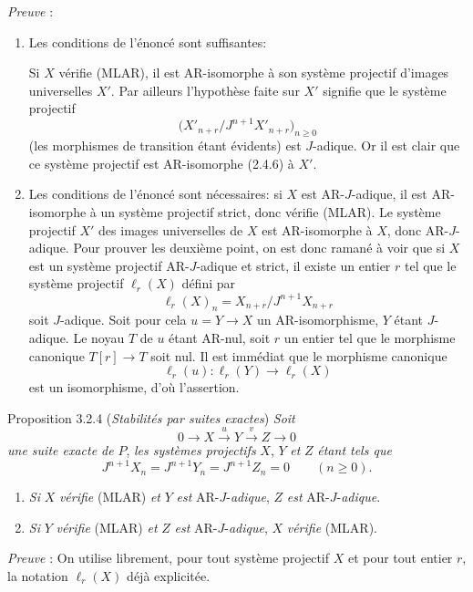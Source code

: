 \emph{Preuve} :
\begin{enumerate}[label=(\alph*)]
\item Les conditions de l'énoncé sont suffisantes:

Si $X$ vérifie (MLAR), il est AR-isomorphe à son système projectif d'images universelles $X'$. Par ailleurs l'hypothèse faite sur $X'$ signifie que le système projectif
\[
\bigl(X'_{n+r}/J^{n+1}X'_{n+r}\bigr)_{n\ge0}
\]
(les morphismes de transition étant évidents) est $J$-adique. Or il est clair que ce système projectif est AR-isomorphe (2.4.6) à $X'$.
\item Les conditions de l'énoncé sont nécessaires: si $X$ est AR-$J$-adique, il est AR-isomorphe à un système projectif strict, donc vérifie (MLAR). 
Le
système projectif $X'$ des images universelles de $X$ est AR-isomorphe à $X$, donc AR-$J$-adique. Pour prouver les deuxième point, on est donc ramané à voir que si $X$ est un système projectif AR-$J$-adique et strict, il existe un entier $r$ tel que le système projectif $\ell_r(X)$ défini par
\[
\ell_r(X)_n=X_{n+r}/J^{n+1}X_{n+r}
\]
soit $J$-adique. Soit pour cela $u=Y\to X$ un AR-isomorphisme, $Y$ étant $J$-adique. Le noyau $T$ de $u$ étant AR-nul, soit $r$ un entier tel que le morphisme canonique $T[r]\to T$ soit nul. Il est immédiat que le morphisme canonique
\[
\ell_r(u):\ell_r(Y)\longrightarrow\ell_r(X)
\]
est un isomorphisme, d'où l'assertion.
\end{enumerate}

\begin{statement}{Proposition 3.2.4 (\emph{Stabilités par suites exactes})}
\emph{Soit}
\[
0\longrightarrow X\stackrel{u}{\longrightarrow}Y\stackrel{v}{\longrightarrow}Z\longrightarrow0
\]
\emph{une suite exacte de} $P$, \emph{les systèmes projectifs} $X$, $Y$ \emph{et} $Z$ \emph{étant tels que}
\[
J^{n+1}X_n=J^{n+1}Y_n=J^{n+1}Z_n=0\qquad(n\ge0).
\]
\begin{enumerate}[label=(\roman*)]
\item \emph{Si} $X$ \emph{vérifie} (MLAR) \emph{et} $Y$ \emph{est} AR-$J$-\emph{adique}, $Z$ \emph{est} AR-$J$-\emph{adique}.
\item \emph{Si} $Y$ \emph{vérifie} (MLAR) \emph{et} $Z$ \emph{est} AR-$J$-\emph{adique}, $X$ \emph{vérifie} (MLAR).
\end{enumerate}
\end{statement}

\emph{Preuve} : On utilise librement, pour tout système projectif $X$ et pour tout entier $r$, la notation $\ell_r(X)$ déjà explicitée.

